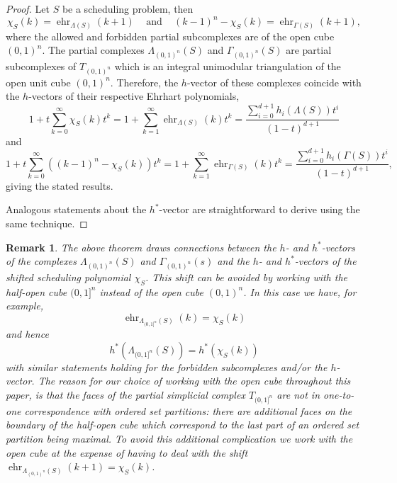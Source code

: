 \documentclass[12pt,reqno]{amsart}
\numberwithin{definition}{section}
\newtheorem{remark}[definition]{Remark}
\theoremstyle{definition}
\newcommand{\ehr}{\operatorname{ehr}}
\newcommand{\T}{T} %
\newcommand{\TC}{\T_{(0,1)^n}} %
\newcommand{\allow}{\Lambda} %
\newcommand{\poly}{\chi} %
\newcommand{\forb}{\Gamma} %
\newcommand{\allowC}{\allow_{(0,1)^n}} %
\newcommand{\forbC}{\forb_{(0,1)^n}} %
\begin{document}


\begin{proof}
Let $S$ be a scheduling problem, then
\[
  \poly_S(k) = \ehr_{\allow(S)}(k+1) \;\;\; \text{ and } \;\;\; (k-1)^n - \poly_{S}(k) = \ehr_{\forb(S)}(k+1),
\]
where the allowed and forbidden partial subcomplexes are of the open cube $(0,1)^n$. The partial complexes $\allowC(S)$ and $\forbC(S)$ are partial subcomplexes of $\TC$ which is an integral unimodular triangulation of the open unit cube $(0,1)^n$. Therefore, the $h$-vector of these complexes coincide with the $h$-vectors of their respective Ehrhart polynomials,
\[
 1 + t\sum_{k = 0}^\infty \poly_S(k) t^k =  1 + \sum_{k = 1}^\infty \ehr_{\allow(S)}(k) t^k = \frac{\sum_{i=0}^{d+1} h_i(\allow(S)) t^i}{(1-t)^{d+1}}
\]
and
\[
 1 + t\sum_{k = 0}^\infty \left( (k-1)^n - \poly_S(k) \right) t^k =  1 + \sum_{k = 1}^\infty \ehr_{\forb(S)}(k) t^k = \frac{\sum_{i=0}^{d+1} h_i(\forb(S)) t^i}{(1-t)^{d+1}},
\]
giving the stated results.

 Analogous statements about the $h^*$-vector are straightforward to derive using the same technique.


\end{proof}

\begin{remark}
The above theorem draws connections between the $h$- and $h^*$-vectors of the complexes $\allowC(S)$ and $\forbC(s)$ and the $h$- and $h^*$-vectors of the \emph{shifted} scheduling polynomial $\poly_S$. This shift can be avoided by working with the half-open cube $(0,1]^n$ instead of the open cube $(0,1)^n$. In this case we have, for example,
\[
  \ehr_{\allow_{(0,1]^n}(S)}(k) = \poly_S(k)
\]
and hence
\[
  h^*(\allow_{(0,1]^n}(S)) = h^*(\poly_S(k))
\]
with similar statements holding for the forbidden subcomplexes and/or the $h$-vector. The reason for our choice of working with the open cube throughout this paper, is that the faces of the partial simplicial complex $T_{(0,1]^n}$ are not in one-to-one correspondence with ordered set partitions: there are additional faces on the boundary of the half-open cube which correspond to the last part of an ordered set partition being maximal. To avoid this additional complication we work with the open cube at the expense of having to deal with the shift $\ehr_{\allow_{(0,1)^n}(S)}(k+1) = \poly_S(k)$.
\end{remark}
\end{document}
